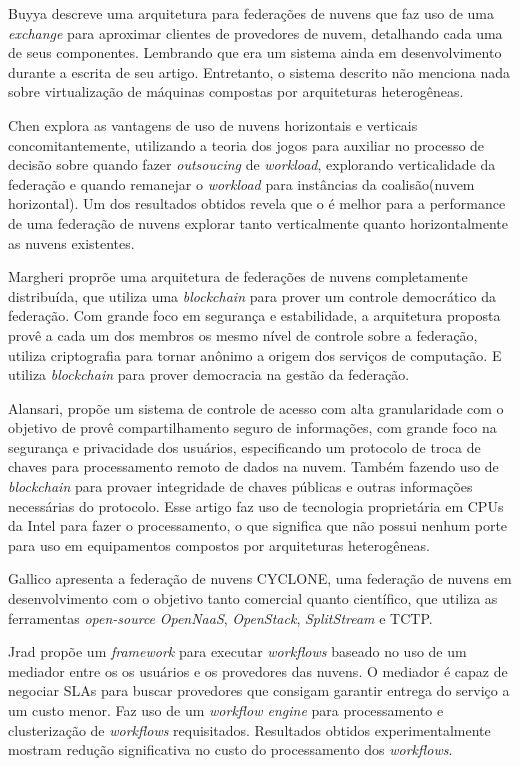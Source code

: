 Buyya\cite{Buyya:2010:IUF:2143583.2143586} descreve uma arquitetura para federações de nuvens que faz uso de uma \textit{exchange} para aproximar clientes de provedores de nuvem, detalhando cada uma de seus componentes. Lembrando que era um sistema ainda em desenvolvimento durante a escrita de seu artigo. Entretanto, o sistema descrito não menciona nada sobre virtualização de máquinas compostas por arquiteturas heterogêneas.

Chen\cite{7835207} explora as vantagens de uso de nuvens horizontais e verticais concomitantemente, utilizando a teoria dos jogos para auxiliar no processo de decisão sobre quando fazer \textit{outsoucing} de \textit{workload}, explorando verticalidade da federação e quando remanejar o \textit{workload} para instâncias da coalisão(nuvem horizontal). Um dos resultados obtidos revela que o é melhor para a performance de uma federação de nuvens explorar tanto verticalmente quanto horizontalmente as nuvens existentes.

Margheri \cite{FaaS_8030651} proprõe uma arquitetura de federações de nuvens completamente distribuída, que utiliza uma \textit{blockchain} para prover um controle democrático da federação. Com grande foco em segurança e estabilidade, a arquitetura proposta provê a cada um dos membros os mesmo nível de controle sobre a federação, utiliza criptografia para tornar anônimo a origem dos serviços de computação. E utiliza \textit{blockchain} para prover democracia na gestão da federação.

Alansari\cite{ACS_Federation_7980160}, propõe um sistema de controle de acesso com alta granularidade com o objetivo de provê compartilhamento seguro de informações, com grande foco na segurança e privacidade dos usuários, especificando um protocolo de troca de chaves para processamento remoto de dados na nuvem. Também fazendo uso de \textit{blockchain} para provaer integridade de chaves públicas e outras informações necessárias do protocolo. Esse artigo faz uso de tecnologia proprietária em \acrshort{CPU}s da Intel para fazer o processamento, o que significa que não possui nenhum porte para uso em equipamentos compostos por arquiteturas heterogêneas.

Gallico\cite{CYCLONE_7776591} apresenta a federação de nuvens CYCLONE, uma federação de nuvens em desenvolvimento com o objetivo tanto comercial quanto científico, que utiliza as ferramentas \textit{open-source} \textit{OpenNaaS}, \textit{OpenStack}, \textit{SplitStream} e \acrfull{TCTP}.

Jrad\cite{Jrad:2013:BFM:2462326.2462339} propõe um \textit{framework} para executar \textit{workflows} baseado no uso de um mediador entre os os usuários e os provedores das nuvens. O mediador é capaz de negociar \acrshort{SLA}s para buscar provedores que consigam garantir entrega do serviço a um custo menor. Faz uso de um \textit{workflow engine} para processamento e clusterização de \textit{workflows} requisitados. Resultados obtidos experimentalmente mostram redução significativa no custo do processamento dos \textit{workflows}.

